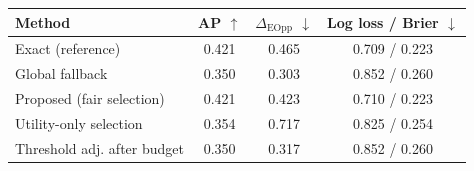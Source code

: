 \begin{tabularx}{\tablewidth}{Xccc}
\toprule
Method & AP $\uparrow$ & $\Delta_{\mathrm{EOpp}}$ $\downarrow$ & Log loss / Brier $\downarrow$\\
\midrule
Exact (reference) & 0.421 & 0.465 & 0.709 / 0.223\\
Global fallback & 0.350 & 0.303 & 0.852 / 0.260\\
Proposed (fair selection) & 0.421 & 0.423 & 0.710 / 0.223\\
Utility-only selection & 0.354 & 0.717 & 0.825 / 0.254\\
Threshold adj. after budget & 0.350 & 0.317 & 0.852 / 0.260\\
\bottomrule
\end{tabularx}
